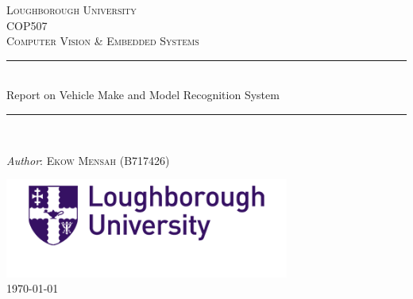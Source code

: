 \documentclass[a4paper, 12pt]{article}
\begin{document}
\begin{titlepage}

 \newcommand{\HRule}{\rule{\linewidth}{0.5mm}}
 
 \center %
 
 \textsc{\LARGE Loughborough University}\\[1.5cm]
 
 \textsc{\Large COP507}\\[0.5cm]
 
 \textsc{\large Computer Vision \& Embedded Systems}\\[0.5cm]
 
\HRule\\[0.4cm]

 {\huge Report on Vehicle Make and Model Recognition System}\\[0.4cm]

\HRule\\[1.5cm]

\begin{minipage}{0.4\textwidth}
 \begin{center}
   \large
   \textit{Author}: \textsc{Ekow Mensah (B717426)}
 \end{center}
 \end{minipage}

\vfill\vfill

\includegraphics[width=0.7\textwidth]{logo.png}\\[1cm]

\vfill\vfill\vfill
{\large\today}

 
\end{titlepage}
 
 \newpage
 
 \tableofcontents{}
 
 \newpage
 
\end{document}
